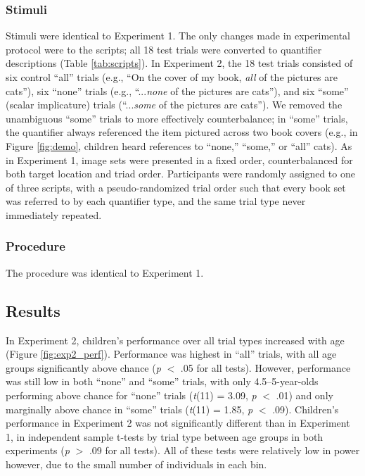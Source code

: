 \documentclass[man]{apa2}
\begin{document}
\subsubsection{Stimuli}
Stimuli were identical to Experiment 1. The only changes made in experimental protocol were to the scripts;  all 18 test trials were converted to quantifier descriptions (Table \ref{tab:scripts}). In Experiment 2, the 18 test trials consisted of six control ``all'' trials (e.g., ``On the cover of my book, \textit{all} of the pictures are cats''), six ``none'' trials (e.g., ``...\textit{none} of the pictures are cats''), and six ``some'' (scalar implicature) trials (``...\textit{some} of the pictures are cats''). We removed the unambiguous ``some'' trials to more effectively counterbalance; in ``some'' trials, the quantifier always referenced the item pictured across two book covers (e.g., in Figure \ref{fig:demo}, children heard references to ``none,'' ``some,'' or ``all'' cats). As in Experiment 1, image sets were presented in a fixed order, counterbalanced for both target location and triad order. Participants were randomly assigned to one of three scripts, with a pseudo-randomized trial order such that every book set was referred to by each quantifier type, and the same trial type never immediately repeated.

\subsubsection{Procedure}
The procedure was identical to Experiment 1. 

\subsection{Results}

In Experiment 2, children's performance over all trial types increased with age (Figure \ref{fig:exp2_perf}). Performance was highest in ``all'' trials, with all age groups significantly above chance (\emph{p} $<$ .05 for all tests). However, performance was still low in both ``none'' and ``some'' trials, with only 4.5--5-year-olds performing above chance for ``none'' trials (\textit{t}(11) = 3.09, \textit{p} $<$ .01) and only marginally above chance in ``some'' trials (\textit{t}(11) = 1.85, \textit{p} $<$ .09). Children's performance in Experiment 2 was not significantly different than in Experiment 1, in independent sample t-tests by trial type between age groups in both experiments (\emph{p} $>$ .09 for all tests). All of these tests were relatively low in power  however, due to the small number of individuals in each bin.
\end{document}
